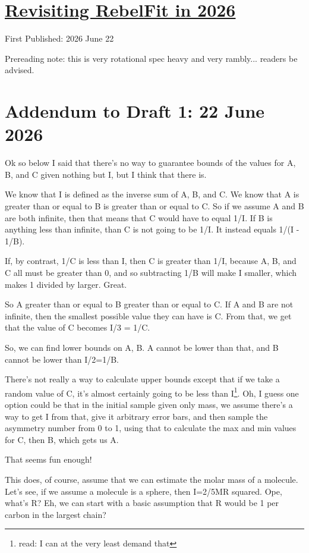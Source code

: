 \documentclass[12pt]{article}
\renewcommand{\,}{\textsuperscript{,}}
\begin{document}
  
\doublespacing  
\section{\href{revisiting-rebelfit-2026.html}{Revisiting RebelFit in 2026}}  
First Published: 2026 June 22

Prereading note: this is very rotational spec heavy and very rambly... readers be advised.

\section{Addendum to Draft 1: 22 June 2026}

Ok so below I said that there's no way to guarantee bounds of the values for A, B, and C given nothing but I, but I think that there is.

We know that I is defined as the inverse sum of A, B, and C. We know that A is greater than or equal to B is greater than or equal to C.  
So if we assume A and B are both infinite, then that means that C would have to equal 1/I.  
If B is anything less than infinite, than C is not going to be 1/I. It instead equals 1/(I - 1/B).

If, by contrast, 1/C is less than I, then C is greater than 1/I, because A, B, and C all must be greater than 0, and so subtracting 1/B will make I smaller, which makes 1 divided by larger.  
Great.

So A greater than or equal to B greater than or equal to C.  
If A and B are not infinite, then the smallest possible value they can have is C.  
From that, we get that the value of C becomes I/3 = 1/C.

So, we can find lower bounds on A, B.  
A cannot be lower than that, and B cannot be lower than I/2=1/B.

There's not really a way to calculate upper bounds except that if we take a random value of C, it's almost certainly going to be less than I\footnote{read: I can at the very least demand that}.  
Oh, I guess one option could be that in the initial sample given only mass, we assume there's a way to get I from that, give it arbitrary error bars, and then sample the asymmetry number from 0 to 1, using that to calculate the max and min values for C, then B, which gets us A.

That seems fun enough!

This does, of course, assume that we can estimate the molar mass of a molecule.  
Let's see, if we assume a molecule is a sphere, then I=2/5MR squared.  
Ope, what's R?  
Eh, we can start with a basic assumption that R would be 1 per carbon in the largest chain?
\end{document}
